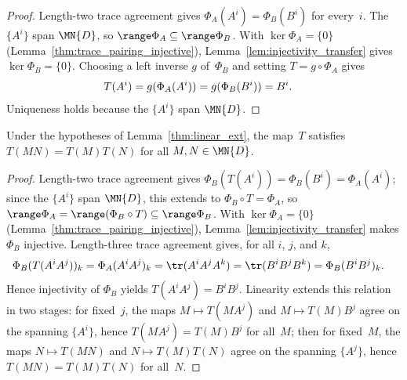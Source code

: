 \begin{proof}
    \leanok
    Length-two trace agreement gives $\Phi_A(A^i) = \Phi_B(B^i)$ for every~$i$.
    The $\{A^i\}$ span $\MN{D}$, so $\range \Phi_A \subseteq
        \range \Phi_B$. With $\ker \Phi_A = \{0\}$
    (Lemma~\ref{thm:trace_pairing_injective}),
    Lemma~\ref{lem:injectivity_transfer} gives $\ker \Phi_B = \{0\}$. Choosing a
    left inverse $g$ of~$\Phi_B$ and setting $T = g \circ \Phi_A$ gives
    \begin{align}
        T(A^i) & = g(\Phi_A(A^i)) = g(\Phi_B(B^i)) = B^i.
        \notag
    \end{align}
    Uniqueness holds because the $\{A^i\}$ span $\MN{D}$.
\end{proof}

\begin{lemma}\label{thm:linear_ext_mul}
    \leanok
    Under the hypotheses of Lemma~\ref{thm:linear_ext}, the map~$T$ satisfies
    $T(MN) = T(M) T(N)$ for all $M, N \in \MN{D}$.
\end{lemma}

\begin{proof}
    \leanok
    Length-two trace agreement gives
    $\Phi_B(T(A^i)) = \Phi_B(B^i) = \Phi_A(A^i)$; since the $\{A^i\}$ span
    $\MN{D}$, this extends to $\Phi_B \circ T = \Phi_A$, so
    $\range \Phi_A = \range(\Phi_B \circ T) \subseteq \range \Phi_B$. With
    $\ker \Phi_A = \{0\}$ (Lemma~\ref{thm:trace_pairing_injective}),
    Lemma~\ref{lem:injectivity_transfer} makes $\Phi_B$ injective. Length-three
    trace agreement gives, for all $i$, $j$, and $k$,
    \begin{align}
        \Phi_B(T(A^i A^j))_k
         & = \Phi_A(A^i A^j)_k
        = \tr(A^i A^j A^k)
        = \tr(B^i B^j B^k)
        = \Phi_B(B^i B^j)_k.
        \notag
    \end{align}
    Hence injectivity of $\Phi_B$ yields
    $T(A^i A^j) = B^i B^j$. Linearity extends this relation in two stages: for
    fixed~$j$, the maps $M \mapsto T(M A^j)$ and $M \mapsto T(M) B^j$ agree on
    the spanning $\{A^i\}$, hence $T(M A^j) = T(M) B^j$ for all~$M$; then for
    fixed~$M$, the maps $N \mapsto T(M N)$ and $N \mapsto T(M) T(N)$ agree on
    the spanning $\{A^j\}$, hence $T(M N) = T(M) T(N)$ for all~$N$.
\end{proof}


